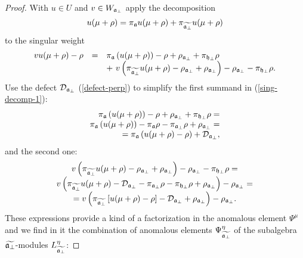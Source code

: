 \begin{proof}
With $u\in U $   and $v\in W_{\mathfrak{a}_{\bot}}$ apply the decomposition
\begin{equation*}
u(\mu +\rho )=\pi _{\mathfrak{a} } u(\mu +\rho )+\pi _{
\widetilde{\mathfrak{a}_{\perp }} } u(\mu +\rho )
\end{equation*}
to the singular weight
\begin{equation}
\label{sing-decomp-1}
\begin{array}{lcl}
vu(\mu +\rho )-\rho &=&\pi _{ \af }\left( u(\mu +\rho
)\right) -\rho +\rho _{\af_{\perp }}+\pi _{ \hfb }\rho \\
&& + \ v\left( \pi _{ \widetilde{%
\af_{\perp }} }u(\mu +\rho )-\rho _{\af_{\perp }}+\rho _{%
\af_{\perp }}\right) -\rho _{\af_{\perp }} -\pi _{ \hfb }\rho.
\end{array}
\end{equation}
Use the defect $\mathcal{D}_{\mathfrak{a}_{\bot}}$ (\ref{defect-perp}) to simplify
the first summand in (\ref{sing-decomp-1}):
\begin{equation*}
\begin{array}{r}
\pi _{ \af }\left( u(\mu +\rho )\right) -\rho +\rho _{%
\mathfrak{a}_{\perp }}+\pi _{ \hfb }\rho = \\
\pi _{ \af }\left( u(\mu +\rho )\right) -\pi _{\af}\rho
-\pi _{\afb}\rho +\rho _{\afb}= \\
=\pi _{ \af }\left( u(\mu +\rho )-\rho \right) +%
\mathcal{D}_{\afb},
\end{array}
\end{equation*}
and the second one:
\begin{equation*}
\begin{array}{c}
v\left( \pi _{ \widetilde{%
\af_{\perp }} }u(\mu +\rho )-\rho _{\af_{\perp }}+\rho _{%
\af_{\perp }}\right) -\rho _{\af_{\perp }}-\pi _{ \hfb }\rho=\\
v\left( \pi _{ \widetilde{%
\afb} }u(\mu +\rho )
- \mathcal{D}_{\afb} - \pi _{ \afb }\rho-\pi _{ \hfb }\rho
+\rho _{\afb}\right) -\rho _{\afb}=\\
=v\left( \pi _{ \widetilde{%
\afb} }\left[ u(\mu +\rho )-\rho\right]
- \mathcal{D}_{\afb}
+\rho _{\afb}\right) -\rho _{\afb}.
\end{array}
\end{equation*}
These expressions provide a kind of a factorization in the anomalous element $\Psi^{\mu
}$ and we find in it the combination of
anomalous elements $\Psi _{\widetilde{\mathfrak{a}_{\perp }}}^{\eta }$ of the
subalgebra $\widetilde{\mathfrak{a}_{\perp }}$-modules $L_{\widetilde{\af%
_{\perp }}}^{\eta }$:

\end{proof}
